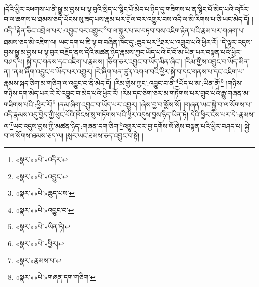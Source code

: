 །དེའི་ཕྱིར་འཕགས་པ་ནི་སྒྱུ་མ་བྱས་པ་ལྟ་བུའི་སྲིད་པ་སྙིང་པོ་མེད་པ་ཉིད་དུ་གཟིགས་པ་ན་སྙིང་པོ་མེད་པའི་འཁོར་བ་ལ་ཆགས་པ་ཐམས་ཅད་ཡོངས་སུ་ཟད་པས་རྣམ་པར་གྲོལ་བར་འགྱུར་བས་འདི་ལ་མི་རིགས་པ་ཅི་ཡང་མེད་དོ། །འདི་\footnote{«སྣར་»«པེ་»འདིར་}རྟེན་ཅིང་འབྲེལ་པར་:འབྱུང་བར་འགྱུར་\footnote{«སྣར་»«པེ་»འབྱུང་}བ་ལ་སྐུར་པ་མ་བཏབ་བས་འཇིག་རྟེན་པའི་རྣམ་པར་གཞག་པ་ཐམས་ཅད་མི་འཇིག་ལ། ཡང་དག་པ་ཇི་ལྟ་བ་བཞིན་ཁོང་དུ་:ཆུད་པར་\footnote{«སྣར་»«པེ་»ཆུད་པས་}ཐར་པ་འགྲུབ་པའི་ཕྱིར་རོ། །དེ་ལྟར་འདུས་བྱས་སྒྱུ་མ་བྱས་པ་ལྟ་བུར་བརྗོད་ནས་དེའི་མཚན་ཉིད་རྣམས་ཀྱང་ཡོད་པའི་ངོ་བོ་མ་ཡིན་པར་བསྟན་པའི་ཕྱིར་བཤད་པ། སྐྱེ་དང་གནས་དང་འཇིག་པ་རྣམས། །ཅིག་ཅར་འབྱུང་བ་ཡོད་མིན་ཞིང་། །རིམ་གྱིས་འབྱུང་བ་ཡོད་མིན་ན། །ནམ་ཞིག་འབྱུང་བ་ཡོད་པར་འགྱུར། །རེ་ཞིག་ཕན་ཚུན་འགལ་བའི་ཕྱིར་སྐྱེ་བ་དང་གནས་པ་དང་འཇིག་པ་རྣམས་སྐད་ཅིག་མ་གཅིག་ལ་འབྱུང་བ་ནི་མེད་དོ། །རིམ་གྱིས་ཀྱང་:འབྱུང་བ་ནི་\footnote{«སྣར་»«པེ་»འབྱུང་བ་}ཡོད་པ་མ་:ཡིན་ནོ།\footnote{«སྣར་»«པེ་»ཡིན་ཏེ།} །གཉིས་གཉིས་དག་མེད་པར་རེ་རེ་འབྱུང་བ་མེད་པའི་ཕྱིར་རོ། །རིམ་དང་ཅིག་ཅར་མ་གཏོགས་པར་གྲུབ་པའི་རྒྱུ་གཞན་མ་གཟིགས་པའི་:ཕྱིར་རོ།\footnote{«སྣར་»«པེ་»ཕྱིར།} །ནམ་ཞིག་འབྱུང་བ་ཡོད་པར་འགྱུར། །ཞེས་བྱ་བ་སྨོས་སོ། །གཞན་ཡང་སྐྱེ་བ་ལ་སོགས་པ་འདི་རྣམས་འདུ་བྱེད་ཀྱི་ཕུང་པོའི་ཁོངས་སུ་གཏོགས་པའི་ཕྱིར་འདུས་བྱས་ཉིད་ཡིན་ཏེ། དེའི་ཕྱིར་ངེས་པར་དེ་:རྣམས་ལ་\footnote{«སྣར་»རྣམས་པ་}ཡང་འདུས་བྱས་ཀྱི་མཚན་ཉིད་:གཞན་དག་ཅིག་\footnote{«སྣར་»«པེ་»གཞན་དག་གཅིག་}འགྱུར་བར་བྱ་དགོས་སོ་ཞེས་བསྟན་པའི་ཕྱིར་བཤད་པ། སྐྱེ་བ་ལ་སོགས་ཐམས་ཅད་ལ། །སླར་ཡང་ཐམས་ཅད་འབྱུང་བ་སྟེ། །

